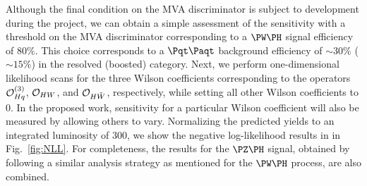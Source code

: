 \documentclass[a4paper,11pt]{article}
\newcommand{\Pt}{{{\Pqt}}\xspace}
\newcommand{\PAt}{{{{\Paqt}}}\xspace}
\begin{document}
Although the final condition on the MVA discriminator is subject to development during the project, 
we can obtain a simple assessment of the sensitivity with a threshold on the MVA discriminator corresponding to a $\PW\PH$ signal efficiency of $80\%$.
This choice corresponds to a $\Pt\PAt$ background efficiency of $\sim 30\%$ ($\sim 15\%$) in the resolved (boosted) category.
Next, we perform one-dimensional likelihood scans for the three Wilson coefficients corresponding to the operators ${\cal O}^{(3)}_{Hq}$, ${\cal O}_{HW}$, and ${\cal O}_{H\tilde{W}}$, respectively, while setting all other Wilson coefficients to $0$. 
In the proposed work, sensitivity for a particular Wilson coefficient will also be measured by allowing others to vary.
Normalizing the predicted yields to an integrated luminosity of 300\fbinv, we show the negative log-likelihood results in in Fig.~\ref{fig:NLL}. %
For completeness, the results for the $\PZ\PH$ signal, obtained by following a similar analysis strategy as mentioned for the $\PW\PH$ process, are also combined. 
\end{document}

